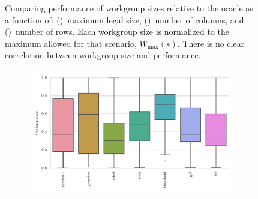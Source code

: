 \documentclass[nonatbib,preprint,nocopyrightspace,9pt]{sigplanconf}
\begin{document}
\begin{figure}
\begin{subfigure}[h]{.48\columnwidth}
      \vspace{-1.5em} %
      \caption{}
      \label{fig:performance-wg-r}
    \end{subfigure}
    \caption{%
    Comparing performance of workgroup sizes relative to the oracle as a
    function of: ()~maximum legal size,
    ()~number of columns, and ()~number of rows. Each workgroup size is normalized to the
    maximum allowed for that scenario, $W_{\max}(s)$. There is no clear
    correlation between workgroup size and performance.%
    \vspace{-1em}
    }
    \label{fig:performance-wgsizes}
  \end{figure}

  \begin{figure}
    \begin{subfigure}[h]{\columnwidth}
      \centering
      \includegraphics[width=\columnwidth]{img/performance_kernels.pdf}
      \vspace{-1.5em} %
      \caption{}
      \label{fig:performance-kernels}
    \end{subfigure}
    \\
    \begin{subfigure}[h]{.48\columnwidth}
      \centering

\end{subfigure}
\end{figure}
\end{document}
